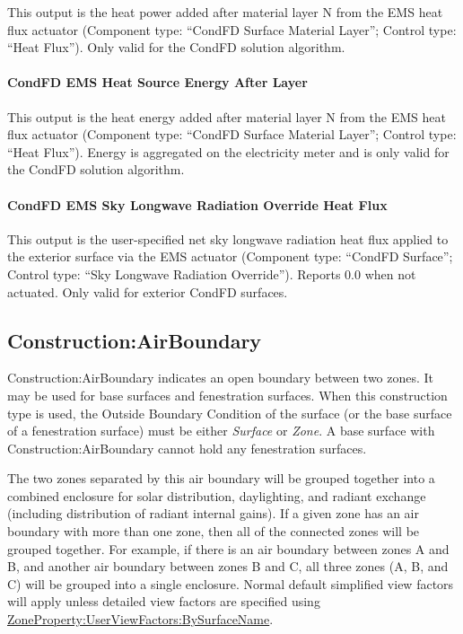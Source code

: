 This output is the heat power added after material layer N from the EMS heat flux actuator (Component type: ``CondFD Surface Material Layer''; Control type: ``Heat Flux''). Only valid for the CondFD solution algorithm.

\paragraph{CondFD EMS Heat Source Energy After Layer}

This output is the heat energy added after material layer N from the EMS heat flux actuator (Component type: ``CondFD Surface Material Layer''; Control type: ``Heat Flux''). Energy is aggregated on the electricity meter and is only valid for the CondFD solution algorithm.

\paragraph{CondFD EMS Sky Longwave Radiation Override Heat Flux}

This output is the user-specified net sky longwave radiation heat flux applied to the exterior surface via the EMS actuator (Component type: ``CondFD Surface''; Control type: ``Sky Longwave Radiation Override''). Reports 0.0 when not actuated. Only valid for exterior CondFD surfaces.

\subsection{Construction:AirBoundary}\label{constructionairboundary}

Construction:AirBoundary indicates an open boundary between two zones. It may be used for base surfaces and fenestration surfaces.
When this construction type is used, the Outside Boundary Condition of the surface (or the base surface of a fenestration surface)
must be either \textit{Surface} or \textit{Zone}. A base surface with Construction:AirBoundary cannot hold any fenestration surfaces.

The two zones separated by this air boundary will be grouped together into a combined enclosure for solar distribution, daylighting, and radiant exchange (including distribution of radiant internal gains). If a given zone has an air boundary with more than one zone, then all of the connected zones will be grouped together. For example, if there is an air boundary between zones A and B, and another air boundary between zones B and C, all three zones (A, B, and C) will be grouped into a single enclosure. Normal default simplified view factors will apply unless detailed view factors are specified using \hyperref[zonepropertyuserviewfactorsbysurfacename]{ZoneProperty:UserViewFactors:BySurfaceName}.

